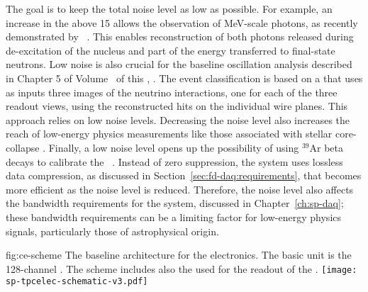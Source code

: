 The goal is to keep the total noise level as low as possible. For example, an 
increase in the  above 15 allows the observation of MeV-scale photons, 
as recently demonstrated by ~\cite{Acciarri:2018myr}. This enables  
reconstruction of both photons released during de-excitation of the nucleus and 
part of the energy transferred to final-state neutrons. Low noise is also crucial
for the baseline oscillation analysis described in Chapter 5 of Volume~\volnumberphysics{} 
of this , \voltitlephysics{}. The event classification is based
on a  that uses as inputs three images of the neutrino interactions, 
one for each of the three readout views, using the reconstructed hits on the 
individual wire planes. This approach relies on low noise levels. Decreasing 
the noise level also increases the reach of low-energy physics measurements 
like those associated with stellar core-collapse . 
Finally, a low noise level opens up the possibility of using $\mathrm{{}^{39}Ar}$ 
beta decays to calibrate the  ~\cite{MICROBOONE-NOTE-1050-PUB}.
Instead of zero suppression, the   system uses lossless 
data compression, as discussed in Section~\ref{sec:fd-daq:requirements}, that
becomes more efficient as the noise level is reduced. Therefore, the noise level 
also affects the bandwidth requirements for the  system,
discussed in Chapter~\ref{ch:sp-daq};
these bandwidth requirements can be a limiting factor for low-energy
physics signals, particularly those of astrophysical origin.

\begin{dunefigure}
{fig:ce-scheme}
{The baseline architecture for the  electronics. The basic unit is the
128-channel . The scheme includes also the
 used for the readout of the .}
\texttt{[image: sp-tpcelec-schematic-v3.pdf]}
\end{dunefigure}

